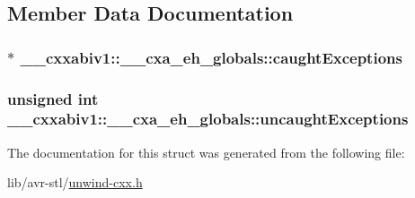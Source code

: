\subsection{Member Data Documentation}
\hypertarget{struct____cxxabiv1_1_1____cxa__eh__globals_a77348d2bb5877643cae07015a2453eb5}{
\subsubsection[{caught\-Exceptions}]{$\ast$ \-\_\-\-\_\-cxxabiv1\-::\-\_\-\-\_\-cxa\-\_\-eh\-\_\-globals\-::caught\-Exceptions}}\label{struct____cxxabiv1_1_1____cxa__eh__globals_a77348d2bb5877643cae07015a2453eb5}
\hypertarget{struct____cxxabiv1_1_1____cxa__eh__globals_a59d046223bdff74671ce9fc40d28bfa4}{
\subsubsection[{uncaught\-Exceptions}]{\setlength{\rightskip}{0pt plus 5cm}unsigned int \-\_\-\-\_\-cxxabiv1\-::\-\_\-\-\_\-cxa\-\_\-eh\-\_\-globals\-::uncaught\-Exceptions}}\label{struct____cxxabiv1_1_1____cxa__eh__globals_a59d046223bdff74671ce9fc40d28bfa4}


The documentation for this struct was generated from the following file\-:\begin{DoxyCompactItemize}
\item 
lib/avr-\/stl/\hyperlink{unwind-cxx_8h}{unwind-\/cxx.\-h}\end{DoxyCompactItemize}
